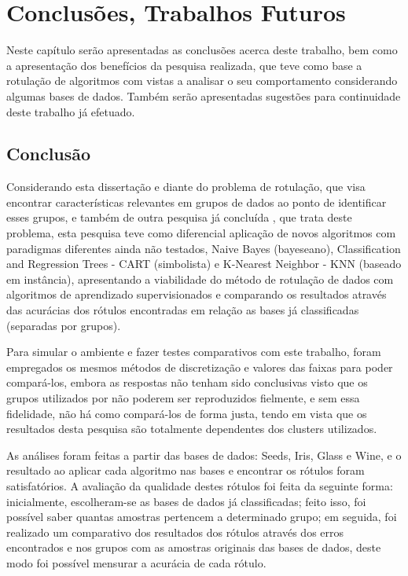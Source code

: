 \chapter{Conclusões, Trabalhos Futuros}\label{cap:conclusao} 

Neste capítulo serão apresentadas as conclusões acerca deste trabalho, bem como a apresentação dos benefícios da pesquisa realizada, que teve como base a rotulação de algoritmos com vistas a analisar o seu comportamento considerando algumas bases de dados. Também serão apresentadas sugestões para continuidade deste trabalho já efetuado. 

\section{Conclusão}\label{cond}




Considerando esta dissertação e diante do problema de rotulação, que visa encontrar características relevantes em grupos de dados ao ponto de identificar esses grupos, e também de outra pesquisa já concluída \cite{Lopes2016}, que trata deste problema, esta pesquisa teve como diferencial aplicação de novos algoritmos com paradigmas diferentes ainda não testados, Naive Bayes (bayeseano), Classification and Regression Trees - CART (simbolista) e K-Nearest Neighbor - KNN (baseado em instância), apresentando a viabilidade do método de rotulação de dados com algoritmos de aprendizado supervisionados e comparando os resultados através das acurácias dos rótulos encontradas em relação as bases já classificadas (separadas por grupos).

Para simular o ambiente e fazer testes comparativos com este trabalho, foram empregados os mesmos  métodos de discretização e valores das faixas para poder compará-los, embora as respostas não tenham sido conclusivas visto que os grupos utilizados por \cite{Lopes2016} não poderem ser reproduzidos fielmente, e sem essa fidelidade, não há como compará-los de forma justa, tendo em vista que os resultados desta pesquisa são totalmente dependentes dos clusters utilizados.


As análises foram feitas a partir das bases de dados: Seeds, Iris, Glass e Wine, e o resultado ao aplicar cada algoritmo nas bases e encontrar os rótulos foram satisfatórios. A avaliação da qualidade destes rótulos foi feita da seguinte forma: inicialmente, escolheram-se as bases de dados já classificadas; feito isso, foi possível saber quantas amostras pertencem a determinado grupo; em seguida, foi realizado um comparativo dos resultados dos rótulos através dos erros encontrados e nos grupos com as amostras originais das bases de dados, deste modo foi possível mensurar a acurácia de cada rótulo. 


